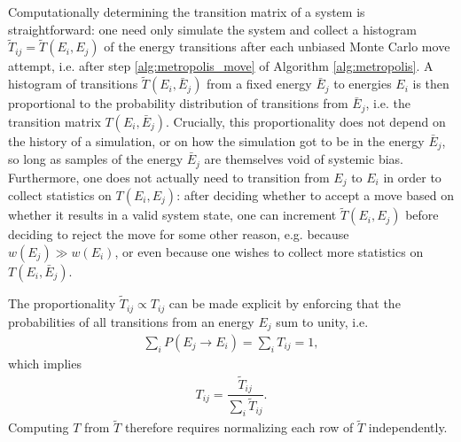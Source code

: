 \documentclass[11pt]{article}
\newcommand{\f}[2]{\dfrac{#1}{#2}} %
\newcommand{\p}[1]{\left(#1\right)} %
\begin{document}
Computationally determining the transition matrix of a system is
straightforward: one need only simulate the system and collect a
histogram $\tilde T_{ij}=\tilde T\p{E_i,E_j}$ of the energy
transitions after each unbiased Monte Carlo move attempt, i.e. after
step \ref{alg:metropolis_move} of Algorithm \ref{alg:metropolis}. A
histogram of transitions $\tilde T\p{E_i,\bar E_j}$ from a fixed
energy $\bar E_j$ to energies $E_i$ is then proportional to the
probability distribution of transitions from $\bar E_j$, i.e. the
transition matrix $T\p{E_i,\bar E_j}$. Crucially, this proportionality
does not depend on the history of a simulation, or on how the
simulation got to be in the energy $\bar E_j$, so long as samples of
the energy $\bar E_j$ are themselves void of systemic
bias. Furthermore, one does not actually need to transition from $E_j$
to $E_i$ in order to collect statistics on $T\p{E_i,E_j}$: after
deciding whether to accept a move based on whether it results in a
valid system state, one can increment $\tilde T\p{E_i,E_j}$ before
deciding to reject the move for some other reason, e.g. because
$w\p{E_j}\gg w\p{E_i}$, or even because one wishes to collect more
statistics on $T\p{E_i,\bar E_j}$.

The proportionality $\tilde T_{ij}\propto T_{ij}$ can be made explicit
by enforcing that the probabilities of all transitions from an energy
$E_j$ sum to unity, i.e.
\begin{align}
  \sum_iP\p{E_j\to E_i}=\sum_iT_{ij}=1,
  \label{eq:transition_norm_condition}
\end{align}
which implies
\begin{align}
  T_{ij}=\f{\tilde T_{ij}}{\sum_i\tilde T_{ij}}.
  \label{eq:transition_normalization}
\end{align}
Computing $T$ from $\tilde T$ therefore requires normalizing each row
of $\tilde T$ independently.
\end{document}
